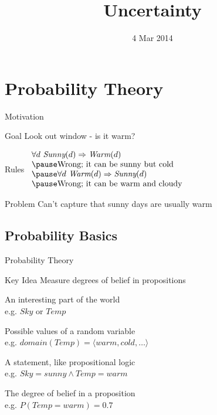 \documentclass[14pt]{beamer}
\title{Uncertainty}
\date{4 Mar 2014}
\begin{document}
\begin{frame}
	\titlepage
\end{frame}

\section{Probability Theory}
\begin{frame}{Motivation}
	\begin{block}{Goal}
		Look out window - is it warm?
	\end{block}
	\pause
	\begin{block}{Rules}
		$
		\begin{array}{l}
			\forall d\ \textit{Sunny}(d) \Rightarrow \textit{Warm}(d) \\
			\pause \mbox{Wrong; it can be sunny but cold} \\
			\pause \forall d\ \textit{Warm}(d) \Rightarrow \textit{Sunny}(d) \\
			\pause\mbox{Wrong; it can be warm and cloudy} \\
		\end{array}
		$
	\end{block}
	\pause
	\begin{block}{Problem}
		Can't capture that sunny days are usually warm
	\end{block}
\end{frame}


\subsection{Probability Basics}

\begin{frame}{Probability Theory}
\begin{block}{Key Idea}
Measure degrees of belief in propositions
\end{block}
\bigskip
\begin{description}
\pause
\item[Random Variable]
An interesting part of the world \\
e.g. $\textit{Sky}$ or $\textit{Temp}$
\pause
\item[Domain]
Possible values of a random variable \\
e.g. $\textit{domain}(\textit{Temp})=\langle\textit{warm}, \textit{cold}, \ldots\rangle$
\pause
\item[Proposition]
A statement, like propositional logic \\
e.g. $\textit{Sky} = \textit{sunny} \land \textit{Temp} = \textit{warm}$
\pause
\item[Probability]
The degree of belief in a proposition \\
e.g. $P(\textit{Temp} = \textit{warm}) = 0.7$
\end{description}
\end{frame}
\end{document}
